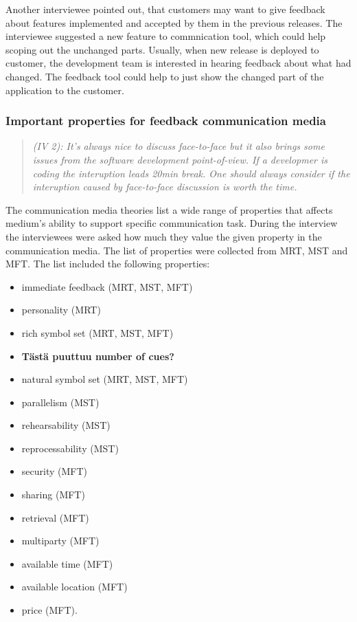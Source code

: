 \documentclass[english,12pt,a4paper,pdftex]{article}
\newcommand{\q}[2]{
\begin{quote}
\emph{(IV #1): #2}
\end{quote}}
\begin{document}
Another interviewee pointed out, that customers may want to give feedback about features implemented and accepted by them in the previous releases. The interviewee suggested a new feature to commnication tool, which could help scoping out the unchanged parts. Usually, when new release is deployed to customer, the development team is interested in hearing feedback about what had changed. The feedback tool could help to just show the changed part of the application to the customer.

\subsubsection{Important properties for feedback communication media}

\q{2}{It's always nice to discuss face-to-face but it also brings some issues from the software development point-of-view. If a developmer is coding the interuption leads 20min break. One should always consider if the interuption caused by face-to-face discussion is worth the time.}

The communication media theories list a wide range of properties that affects medium's ability to support specific communication task. During the interview the interviewees were asked how much they value the given property in the communication media. The list of properties were collected from \ac{MRT}, \ac{MST} and \ac{MFT}. The list included the following properties:

\begin{itemize}
  \item immediate feedback (\acs{MRT}, \acs{MST}, \acs{MFT})
  \item personality (\acs{MRT})
  \item rich symbol set (\acs{MRT}, \acs{MST}, \acs{MFT})
  \item \textbf{Tästä puuttuu number of cues?}
  \item natural symbol set (\acs{MRT}, \acs{MST}, \acs{MFT})
  \item parallelism (\acs{MST})
  \item rehearsability (\acs{MST})
  \item reprocessability (\acs{MST})
  \item security (\acs{MFT})
  \item sharing (\acs{MFT})
  \item retrieval (\acs{MFT})
  \item multiparty (\acs{MFT})
  \item available time (\acs{MFT})
  \item available location (\acs{MFT})
  \item price (\acs{MFT}). 
\end{itemize}
\end{document}
